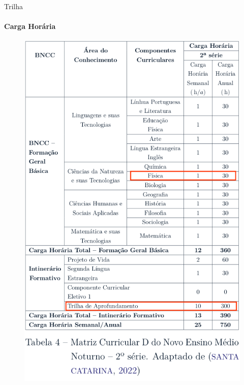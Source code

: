 \documentclass[aspectratio=169]{beamer}
\begin{document}
\begin{frame}{Trilha}
\framesubtitle{Carga Horária}
\begin{figure}[htb!]
	\centering
	\includegraphics[width=.3\linewidth]{carga-horariaNEM.png}
\end{figure}	
\end{frame}
\end{document}
